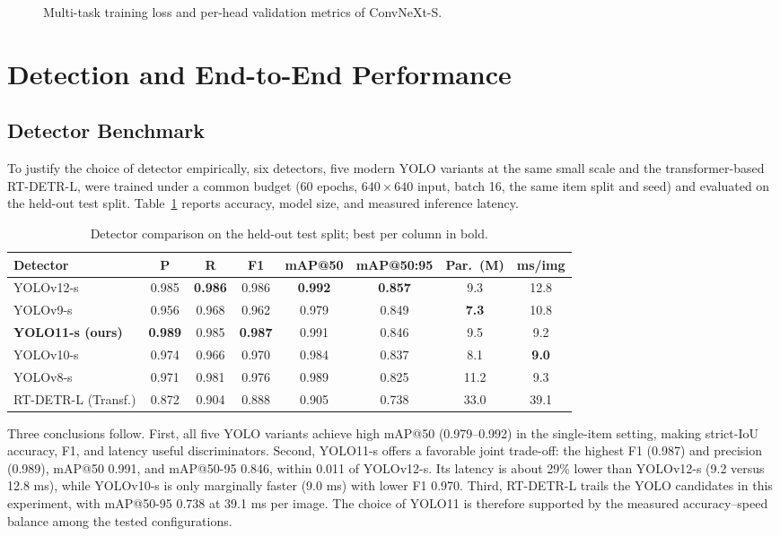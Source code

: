 \begin{figure}[!ht]
    \centering
    \caption{Multi-task training loss and per-head validation metrics of ConvNeXt-S.}
    \label{fig:curves}
\end{figure}

\section{Detection and End-to-End Performance}
\subsection{Detector Benchmark}
To justify the choice of detector empirically, six detectors, five modern YOLO variants at the same small scale and the transformer-based RT-DETR-L, were trained under a common budget (60 epochs, $640\times640$ input, batch 16, the same item split and seed) and evaluated on the held-out test split. Table~\ref{tab:det_compare} reports accuracy, model size, and measured inference latency.

\begin{table}[!h]
\centering
\caption{Detector comparison on the held-out test split; best per column in bold.}
\label{tab:det_compare}
\footnotesize\setlength{\tabcolsep}{2.5pt}
\begin{tabular}{lccccccc}
\toprule
\textbf{Detector} & \textbf{P} & \textbf{R} & \textbf{F1} & \textbf{mAP@50} & \textbf{mAP@50:95} & \textbf{Par.\ (M)} & \textbf{ms/img} \\
\midrule
YOLOv12-s & 0.985 & \textbf{0.986} & 0.986 & \textbf{0.992} & \textbf{0.857} & 9.3 & 12.8 \\
YOLOv9-s & 0.956 & 0.968 & 0.962 & 0.979 & 0.849 & \textbf{7.3} & 10.8 \\
\textbf{YOLO11-s (ours)} & \textbf{0.989} & 0.985 & \textbf{0.987} & 0.991 & 0.846 & 9.5 & 9.2 \\
YOLOv10-s & 0.974 & 0.966 & 0.970 & 0.984 & 0.837 & 8.1 & \textbf{9.0} \\
YOLOv8-s & 0.971 & 0.981 & 0.976 & 0.989 & 0.825 & 11.2 & 9.3 \\
RT-DETR-L (Transf.) & 0.872 & 0.904 & 0.888 & 0.905 & 0.738 & 33.0 & 39.1 \\
\bottomrule
\end{tabular}
\end{table}

Three conclusions follow. First, all five YOLO variants achieve high mAP@50 (0.979--0.992) in the single-item setting, making strict-IoU accuracy, F1, and latency useful discriminators. Second, YOLO11-s offers a favorable joint trade-off: the highest F1 (0.987) and precision (0.989), mAP@50 0.991, and mAP@50-95 0.846, within 0.011 of YOLOv12-s. Its latency is about 29\% lower than YOLOv12-s (9.2 versus 12.8 ms), while YOLOv10-s is only marginally faster (9.0 ms) with lower F1 0.970. Third, RT-DETR-L trails the YOLO candidates in this experiment, with mAP@50-95 0.738 at 39.1 ms per image. The choice of YOLO11 is therefore supported by the measured accuracy--speed balance among the tested configurations.


